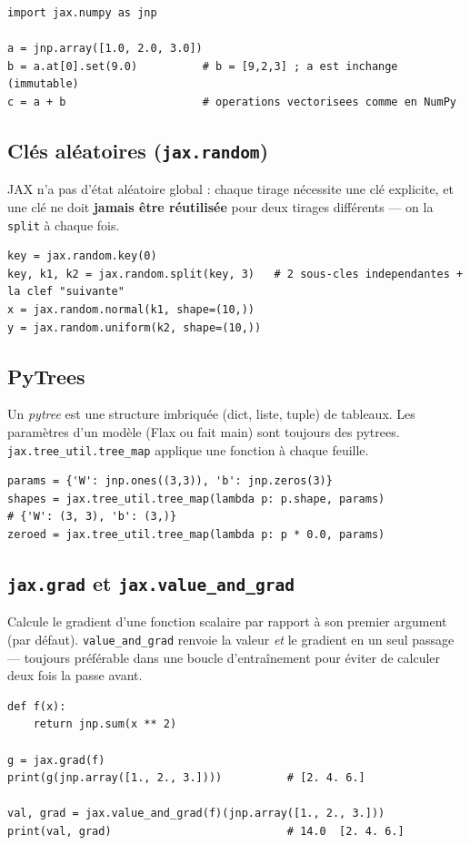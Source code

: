 \documentclass[11pt,a4paper]{article}
\begin{document}
\begin{lstlisting}
import jax.numpy as jnp

a = jnp.array([1.0, 2.0, 3.0])
b = a.at[0].set(9.0)          # b = [9,2,3] ; a est inchange (immutable)
c = a + b                     # operations vectorisees comme en NumPy
\end{lstlisting}

\subsection{Clés aléatoires (\texttt{jax.random})}
JAX n'a pas d'état aléatoire global : chaque tirage nécessite une clé
explicite, et une clé ne doit \textbf{jamais être réutilisée} pour deux
tirages différents --- on la \texttt{split} à chaque fois.

\begin{lstlisting}
key = jax.random.key(0)
key, k1, k2 = jax.random.split(key, 3)   # 2 sous-cles independantes + la clef "suivante"
x = jax.random.normal(k1, shape=(10,))
y = jax.random.uniform(k2, shape=(10,))
\end{lstlisting}

\subsection{PyTrees}
Un \emph{pytree} est une structure imbriquée (dict, liste, tuple) de tableaux.
Les paramètres d'un modèle (Flax ou fait main) sont toujours des pytrees.
\texttt{jax.tree\_util.tree\_map} applique une fonction à chaque feuille.

\begin{lstlisting}
params = {'W': jnp.ones((3,3)), 'b': jnp.zeros(3)}
shapes = jax.tree_util.tree_map(lambda p: p.shape, params)
# {'W': (3, 3), 'b': (3,)}
zeroed = jax.tree_util.tree_map(lambda p: p * 0.0, params)
\end{lstlisting}

\subsection{\texttt{jax.grad} et \texttt{jax.value\_and\_grad}}
Calcule le gradient d'une fonction scalaire par rapport à son premier
argument (par défaut). \texttt{value\_and\_grad} renvoie la valeur \emph{et}
le gradient en un seul passage --- toujours préférable dans une boucle
d'entraînement pour éviter de calculer deux fois la passe avant.

\begin{lstlisting}
def f(x):
    return jnp.sum(x ** 2)

g = jax.grad(f)
print(g(jnp.array([1., 2., 3.])))          # [2. 4. 6.]

val, grad = jax.value_and_grad(f)(jnp.array([1., 2., 3.]))
print(val, grad)                           # 14.0  [2. 4. 6.]
\end{lstlisting}
\end{document}
